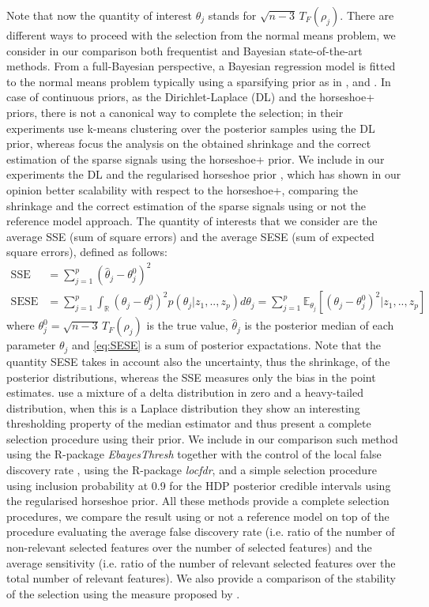 \documentclass[american,]{article}
\theoremstyle{definition}
\begin{document}
Note that now the quantity of interest $\theta_{j}$ stands for $\sqrt{n-3}\,T_{F}(\rho_{j})$. There are different ways to proceed with the selection from the normal means problem, we consider in our comparison both frequentist and Bayesian state-of-the-art methods. From a full-Bayesian perspective, a Bayesian regression model is fitted to the normal means problem typically using a sparsifying prior as in \cite{paper:dirichlet_laplace}, \cite{paper:horseshoe+} and \cite{paper:EBmed}. In case of continuous priors, as the Dirichlet-Laplace (DL) and the horseshoe+ priors, there is not a canonical way to complete the selection; in their experiments \cite{paper:dirichlet_laplace} use k-means clustering over the posterior samples using the DL prior, whereas \cite{paper:horseshoe+} focus the analysis on the obtained shrinkage and the correct estimation of the sparse signals using the horseshoe+ prior. We include in our experiments the DL and the regularised horseshoe prior \citep{paper:rhs}, which has shown in our opinion better scalability with respect to the horseshoe+, comparing the shrinkage and the correct estimation of the sparse signals using or not the reference model approach. The quantity of interests that we consider are the average SSE (sum of square errors) and the average SESE (sum of expected square errors), defined as follows:
\
\begin{align}
\text{SSE}&=\sum_{j=1}^{p}(\hat{\theta}_{j} - \theta^{0}_{j})^{2} \label{eq:SSE} \\
\text{SESE}&=\sum_{j=1}^{p}\int_{\mathbb{R}}(\theta_{j}-\theta^{0}_{j})^{2}p(\theta_{j}|z_{1},..,z_{p})d\theta_{j}=\sum_{j=1}^{p}\mathbb{E}_{\theta_{j}}[(\theta_{j}-\theta^{0}_{j})^{2}|z_{1},..,z_{p}] \label{eq:SESE}
\end{align}
where $\theta_{j}^{0}=\sqrt{n-3}\,T_{F}(\rho_{j})$ is the true value, $\hat{\theta}_{j}$ is the posterior median of each parameter $\theta_{j}$ and \eqref{eq:SESE} is a sum of posterior expactations. Note that the quantity SESE takes in account also the uncertainty, thus the shrinkage, of the posterior distributions, whereas the SSE measures only the bias in the point estimates. \cite{paper:EBmed} use a mixture of a delta distribution in zero and a heavy-tailed distribution, when this is a Laplace distribution they show an interesting thresholding property of the median estimator and thus present a complete selection procedure using their prior. We include in our comparison such method using the R-package \textit{EbayesThresh} together with the control of the local false discovery rate \citep{book:efron, paper:efron}, using the R-package \textit{locfdr}, and a simple selection procedure using inclusion probability at 0.9 for the HDP posterior credible intervals using the regularised horseshoe prior. All these methods provide a complete selection procedures, we compare the result using or not a reference model on top of the procedure evaluating the average false discovery rate (i.e. ratio of the number of non-relevant selected features over the number of selected features) and the average sensitivity (i.e. ratio of the number of relevant selected features over the total number of relevant features). We also provide a comparison of the stability of the selection using the measure proposed by \cite{paper:stability}.
\end{document}

